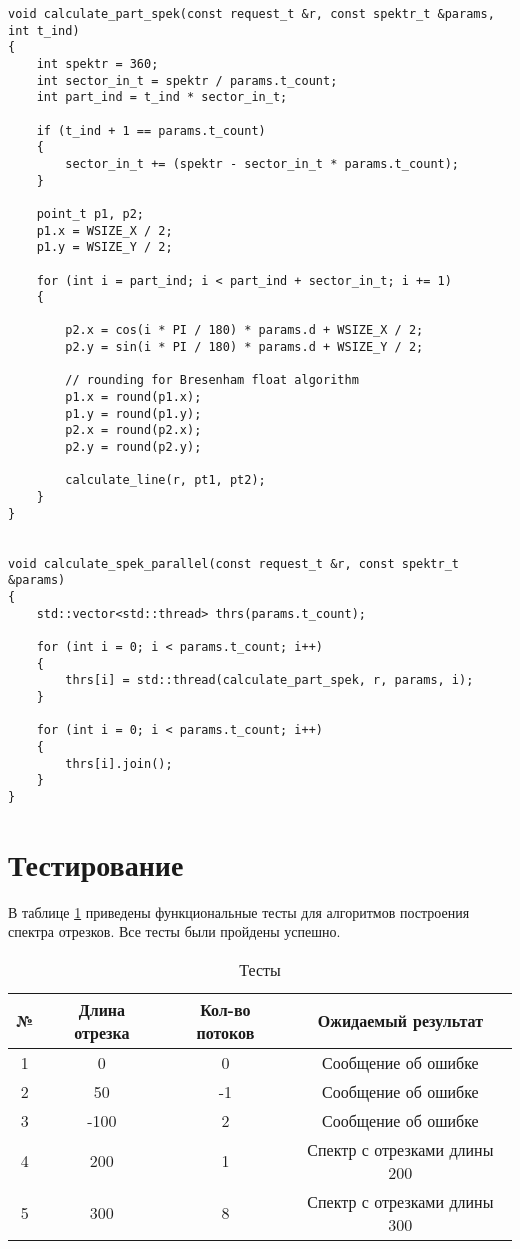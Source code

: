 \begin{lstlisting}[caption=Реализация алгоритма построения спектра отрезков по Брезенехему с многопоточностью,
	label={par}]
void calculate_part_spek(const request_t &r, const spektr_t &params, int t_ind)
{
    int spektr = 360;
    int sector_in_t = spektr / params.t_count;
    int part_ind = t_ind * sector_in_t;

    if (t_ind + 1 == params.t_count)
    {
        sector_in_t += (spektr - sector_in_t * params.t_count);
    }

    point_t p1, p2;
    p1.x = WSIZE_X / 2;
    p1.y = WSIZE_Y / 2;

    for (int i = part_ind; i < part_ind + sector_in_t; i += 1)
    {

        p2.x = cos(i * PI / 180) * params.d + WSIZE_X / 2;
        p2.y = sin(i * PI / 180) * params.d + WSIZE_Y / 2;

        // rounding for Bresenham float algorithm
        p1.x = round(p1.x);
        p1.y = round(p1.y);
        p2.x = round(p2.x);
        p2.y = round(p2.y);

        calculate_line(r, pt1, pt2);
    }
}


void calculate_spek_parallel(const request_t &r, const spektr_t &params)
{
    std::vector<std::thread> thrs(params.t_count);

    for (int i = 0; i < params.t_count; i++)
    {
        thrs[i] = std::thread(calculate_part_spek, r, params, i);
    }

    for (int i = 0; i < params.t_count; i++)
    {
        thrs[i].join();
    }
}
\end{lstlisting}
\captionsetup{singlelinecheck = false, justification=centering}

\section{Тестирование}

В таблице \ref{test} приведены функциональные тесты для алгоритмов построения спектра отрезков. Все тесты были пройдены успешно.


\begin{table}[h]
	\begin{center}
		\caption{\label{test} Тесты}
		\begin{tabular}{|c|c|c|c|}
			\hline
			№ & Длина отрезка & Кол-во потоков & Ожидаемый результат \\
			\hline
            1 & 0 & 0 & Сообщение об ошибке \\
            \hline
            2 & 50 & -1 & Сообщение об ошибке \\
            \hline
            3 & -100 & 2 & Сообщение об ошибке \\
            \hline
            4 & 200 & 1 &  Спектр с отрезками длины 200 \\
			\hline
			5 & 300 & 8 & Спектр с отрезками длины 300 \\
			\hline
		\end{tabular}
	\end{center}
\end{table}

